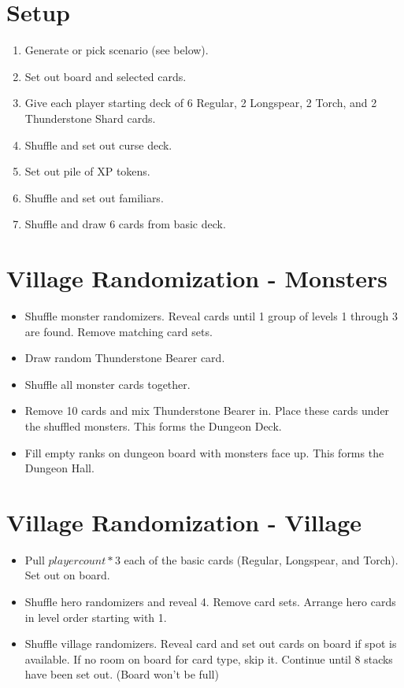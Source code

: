 \documentclass[12pt]{article}
\newenvironment{enumerateCustom}
{\begin{enumerate}
  \setlength{\itemsep}{1pt}
  \setlength{\parskip}{0pt}
  \setlength{\parsep}{0pt}}
{\end{enumerate}}
\newenvironment{itemizeCustom}
{\begin{itemize}
  \setlength{\itemsep}{1pt}
  \setlength{\parskip}{0pt}
  \setlength{\parsep}{0pt}}
{\end{itemize}}
\begin{document}
\begin{mdframed}[style = customFrame]
\begin{multicols*}{2}

\section*{Setup}
\begin{enumerateCustom}
	\item Generate or pick scenario (see below). 
	\item Set out board and selected cards.
	\item Give each player starting deck of 6 Regular, 2 Longspear, 2 Torch, and 2 Thunderstone Shard cards.
	\item Shuffle and set out curse deck.
	\item Set out pile of XP tokens.
	\item Shuffle and set out familiars.
	\item Shuffle and draw 6 cards from basic deck.
\end{enumerateCustom}

\section*{Village Randomization - Monsters}
\begin{itemizeCustom}
	\item Shuffle monster randomizers. Reveal cards until 1 group of levels 1 through 3 are found. Remove matching card sets.
	\item Draw random Thunderstone Bearer card.
	\item Shuffle all monster cards together.
	\item Remove 10 cards and mix Thunderstone Bearer in. Place these cards under the shuffled monsters. This forms the Dungeon Deck.
	\item Fill empty ranks on dungeon board with monsters face up. This forms the Dungeon Hall.
\end{itemizeCustom}

\section*{Village Randomization - Village}
\begin{itemizeCustom}
	\item Pull $player count * 3$ each of the basic cards (Regular, Longspear, and Torch). Set out on board.
	\item Shuffle hero randomizers and reveal 4. Remove card sets. Arrange hero cards in level order starting with 1.
	\item Shuffle village randomizers. Reveal card and set out cards on board if spot is available. If no room on board for card type, skip it. Continue until 8 stacks have been set out. (Board won't be full)
\end{itemizeCustom}


\end{multicols*}
\end{mdframed}
\end{document}
